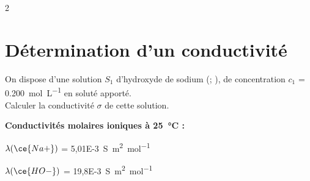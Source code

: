 \documentclass[a4paper,11pt,fleqn]{article}%
\begin{document}
\begin{multicols}{2}
\section{Détermination d'un conductivité}
On dispose d'une solution $S_1$ d'hydroxyde de sodium (; ), de concentration $c_1$ = \SI{0,200}{\mole\per\liter} en soluté apporté.\\
Calculer la conductivité $\sigma$ de cette solution.\\

\noindent \colorbox{red!10}{
    \begin{minipage}{.95\linewidth}
    \textbf{Conductivités molaires ioniques à \SI{25}{\celsius} :}
    \begin{itemize**}
        \item $\lambda (\ce{Na+})$ = \SI{5,01E-3}{\siemens\meter\squared\per\mole}
        \item $\lambda (\ce{HO-})$ = \SI{19,8E-3}{\siemens\meter\squared\per\mole}
    \end{itemize**}
    \end{minipage}}


\end{multicols}
\end{document}
